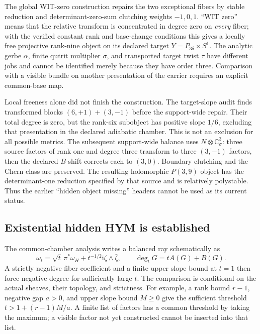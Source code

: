 \documentclass[11pt]{article}
\theoremstyle{definition}
\theoremstyle{remark}
\newcommand{\ii}{\mathrm i}
\begin{document}
The global WIT-zero construction \cite{FRG3R} repairs the two exceptional
fibers by stable reduction and determinant-zero-sum clutching weights
\(-1,0,1\).  ``WIT zero'' means that the relative transform is concentrated
in degree zero on \emph{every} fiber; with the verified constant rank and
base-change conditions this gives a locally free projective rank-nine
object on its declared target \(Y=P_{3\delta}\times S^1\).  The analytic
gerbe \(\alpha\), finite qutrit multiplier \(\sigma\), and transported
target twist \(\tau\) have different jobs and cannot be identified merely
because they have order three.  Comparison with a visible bundle on another
presentation of the carrier requires an explicit common-base map.

Local freeness alone did not finish the construction.  The target-slope
audit \cite{FRG3S} finds transformed blocks \((6,+1)+(3,-1)\) before the
support-wide repair.  Their total degree is zero, but the rank-six subobject
has positive slope \(1/6\), excluding that presentation in the declared
adiabatic chamber.  This is not an exclusion for all possible metrics.
The subsequent support-wide balance \cite{FRG3T} uses
\(N\otimes\mathbb C^3_\sigma\): three source factors of rank one and degree
three transform to three \((3,-1)\) factors, then the declared \(B\)-shift
corrects each to \((3,0)\).  Boundary clutching and the Chern class are
preserved.  The resulting holomorphic \(P(3,9)\) object has the
determinant-one reduction specified by that source and is relatively
polystable.  Thus the earlier ``hidden object missing'' headers cannot be
used as its current status.

\subsection{Existential hidden HYM is established}
\label{sec:hidden-hym}

The common-chamber analysis \cite{FRG3D} writes a balanced ray schematically
as
\[
\omega_t=\sqrt t\,\pi^*\omega_H+
t^{-1/2}\ii\zeta\wedge\bar\zeta,\qquad
\deg_t G=tA(G)+B(G).
\]
A strictly negative fiber coefficient and a finite upper slope bound at
\(t=1\) then force negative degree for sufficiently large \(t\).
The comparison is conditional on the actual sheaves, their topology, and
strictness.  For example, a rank bound \(r-1\), negative gap \(a>0\),
and upper slope bound \(M\ge0\) give the sufficient threshold
\(t>1+(r-1)M/a\).  A finite list of factors has a common threshold by taking
the maximum; a visible factor not yet constructed cannot be inserted into
that list.
\end{document}
